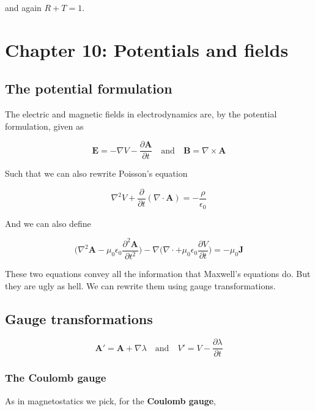 \documentclass[a4paper]{article}
\begin{document}
and again $R+T=1$.

\section{Chapter 10: Potentials and fields}

\subsection{The potential formulation}

The electric and magnetic fields in electrodynamics are, by the potential formulation, given as

\begin{equation*}
    \bm{E}=-\nabla V-\frac{\partial\bm{A}}{\partial t}\quad\text{and}\quad\bm{B}=\nabla\times\bm{A}
\end{equation*}

Such that we can also rewrite Poisson's equation

\begin{equation*}
    \nabla^2V+\frac{\partial}{\partial t}(\nabla\cdot\bm{A})=-\frac{\rho}{\epsilon_0}
\end{equation*}

And we can also define 

\begin{equation*}
    \bigg(\nabla^2\bm{A}-\mu_0\epsilon_0\frac{\partial^2\bm{A}}{\partial t^2}\bigg)-\nabla\bigg(\nabla\cdot+\mu_0\epsilon_0\frac{\partial V}{\partial t}\bigg)=-\mu_0\bm{J}
\end{equation*}

These two equations convey all the information that Maxwell's equations do. But they are ugly as hell. We can rewrite them using gauge transformations.

\subsection{Gauge transformations}

\begin{equation*}
    \bm{A}'=\bm{A}+\nabla\lambda\quad\text{and}\quad V'=V-\frac{\partial\lambda}{\partial t}
\end{equation*}

\subsubsection*{The Coulomb gauge}

As in magnetostatics we pick, for the \textbf{Coulomb gauge},
\end{document}
